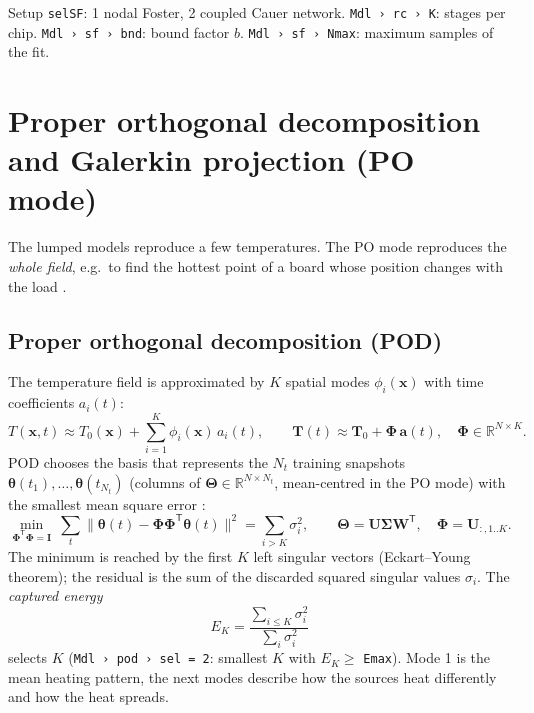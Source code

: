 \documentclass[11pt,a4paper]{article}
\newcommand{\T}{^{\mathsf T}}
\newcommand{\mat}[1]{\bm{#1}}
\newcommand{\cfg}[1]{\texttt{#1}}
\newcommand{\R}{\mathbb{R}}
\begin{document}
\begin{cfgbox}
Setup \cfg{selSF}: 1 nodal Foster, 2 coupled Cauer network. \cfg{Mdl › rc › K}: stages per chip.
\cfg{Mdl › sf › bnd}: bound factor $b$. \cfg{Mdl › sf › Nmax}: maximum samples of the fit.
\end{cfgbox}

\section{Proper orthogonal decomposition and Galerkin projection (PO mode)}\label{sec:pod}
The lumped models reproduce a few temperatures. The PO mode reproduces the \emph{whole field}, e.g.\ to find the
hottest point of a board whose position changes with the load \cite{thermos}.

\subsection{Proper orthogonal decomposition (POD)}
The temperature field is approximated by $K$ spatial modes $\phi_i(\bm x)$ with time coefficients $a_i(t)$:
\begin{equation}
  T(\bm x,t) \approx T_0(\bm x) + \sum_{i=1}^{K}\phi_i(\bm x)\,a_i(t),\qquad
  \bm T(t) \approx \bm T_0 + \bm\Phi\,\bm a(t),\quad \bm\Phi\in\R^{N\times K}.
  \label{eq:podexp}
\end{equation}
POD chooses the basis that represents the $N_t$ training snapshots $\bm\theta(t_1),\dots,\bm\theta(t_{N_t})$ (columns of
$\bm\Theta\in\R^{N\times N_t}$, mean-centred in the PO mode) with the smallest mean square error \cite{holmes}:
\begin{equation}
  \min_{\bm\Phi\T\bm\Phi=\mat I}\ \sum_{t}\bigl\lVert \bm\theta(t) - \bm\Phi\bm\Phi\T\bm\theta(t)\bigr\rVert^2
  = \sum_{i>K}\sigma_i^2,\qquad \bm\Theta = \mat U\bm\Sigma\mat W\T,\quad \bm\Phi = \mat U_{:,1..K}.
\end{equation}
The minimum is reached by the first $K$ left singular vectors (Eckart--Young theorem); the residual is the sum of the
discarded squared singular values $\sigma_i$. The \emph{captured energy}
\begin{equation}
  E_K = \frac{\sum_{i\le K}\sigma_i^2}{\sum_i\sigma_i^2}
\end{equation}
selects $K$ (\cfg{Mdl › pod › sel = 2}: smallest $K$ with $E_K\ge$ \cfg{Emax}). Mode 1 is the mean heating pattern,
the next modes describe how the sources heat differently and how the heat spreads.
\end{document}

